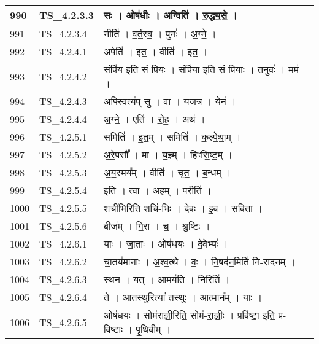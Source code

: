 \documentclass[17pt]{extarticle}
\begin{document}
\begin{longtable}{||p{0.4in}||p{0.9in}||p{4.0in}||p{0.9in}||}
            990 & TS\_4.2.3.3 & सः   ।   ओष॑धीः   ।   अन्विति॑   ।   रु॒द्ध्य॒से॒   ।    &      \\
        \hline
            991 & TS\_4.2.3.4 & नीति॑   ।   व॒र्त॒स्व॒   ।   पुनः॑   ।   अ॒ग्ने॒   ।    &      \\
        \hline
            992 & TS\_4.2.4.1 & अपेति॑   ।   इ॒त॒   ।   वीति॑   ।   इ॒त॒   ।    &      \\
        \hline
            993 & TS\_4.2.4.2 & संप्रि॑य॒ इति॒ सं{-}प्रि॒यः॒   ।   संप्रि॑या॒ इति॒ सं{-}प्रि॒याः॒   ।   त॒नुवः॑   ।   मम॑   ।    &      \\
        \hline
            994 & TS\_4.2.4.3 & अ॒फ्स्वित्य॑प्{-}सु   ।   वा॒   ।   य॒ज॒त्र॒   ।   येन॑   ।    &      \\
        \hline
            995 & TS\_4.2.4.4 & अ॒ग्ने॒   ।   एति॑   ।   रो॒ह॒   ।   अथ॑   ।    &      \\
        \hline
            996 & TS\_4.2.5.1 & समिति॑   ।   इ॒त॒म्   ।   समिति॑   ।   क॒ल्पे॒था॒म्   ।    &      \\
        \hline
            997 & TS\_4.2.5.2 & अ॒रे॒पसौ᳚   ।   मा   ।   य॒ज्ञ्म्   ।   हिꣳ॒॒सि॒ष्ट॒म्   ।    &      \\
        \hline
            998 & TS\_4.2.5.3 & अ॒य॒स्मय᳚म्   ।   वीति॑   ।   चृ॒त॒   ।   ब॒न्धम्   ।    &      \\
        \hline
            999 & TS\_4.2.5.4 & इति॑   ।   त्वा॒   ।   अ॒हम्   ।   परीति॑   ।    &      \\
        \hline
            1000 & TS\_4.2.5.5 & शची॑भि॒रिति॒ शचि॑{-}भिः॒   ।   दे॒वः   ।   इ॒व॒   ।   स॒वि॒ता   ।    &      \\
        \hline
            1001 & TS\_4.2.5.6 & बीज᳚म्   ।   गि॒रा   ।   च॒   ।   श्रु॒ष्टिः   ।    &      \\
        \hline
            1002 & TS\_4.2.6.1 & याः   ।   जा॒ताः   ।   ओष॑धयः   ।   दे॒वेभ्यः॑   ।    &      \\
        \hline
            1003 & TS\_4.2.6.2 & चा॒तय॑मानाः   ।   अ॒श्व॒त्थे   ।   वः॒   ।   नि॒षद॑न॒मिति॑ नि{-}सद॑नम्   ।    &      \\
        \hline
            1004 & TS\_4.2.6.3 & स्थ॒न॒   ।   यत्   ।   आ॒मय॑ति   ।   निरिति॑   ।    &      \\
        \hline
            1005 & TS\_4.2.6.4 & ते   ।   आ॒त॒स्थुरित्या᳚{-}त॒स्थुः   ।   आ॒त्मान᳚म्   ।   याः   ।    &      \\
        \hline
            1006 & TS\_4.2.6.5 & ओष॑धयः   ।   सोम॑राज्ञी॒रिति॒ सोम॑{-}रा॒ज्ञीः॒   ।   प्रवि॑ष्टा॒ इति॒ प्र{-}वि॒ष्टाः॒   ।   पृ॒थि॒वीम्   ।    &      \\

\end{longtable}
\end{document}
